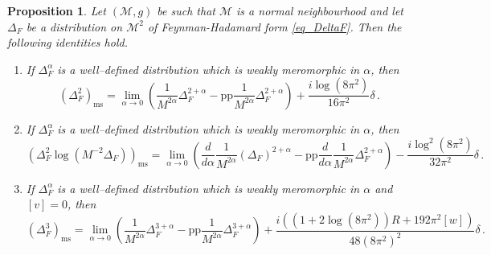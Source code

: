 \documentclass[a4paper,10pt,twoside]{article}
\numberwithin{equation}{section}
\newcounter{and}
\def\M{\mathcal{M}}
\def\pp{\mathrm{pp}}
\def\ms{\mathrm{ms}}
\theoremstyle{plain}
\newtheorem{propo}[theo]{Proposition}
\theoremstyle{definition}
\begin{document}
\begin{propo}\label{prop_equivalentscheme}Let $(\M,g)$ be such that $\M$ is a normal neighbourhood and let $\Delta_F$ be a distribution on $\M^2$ of Feynman-Hadamard form \eqref{eq_DeltaF}. Then the following identities hold.
\begin{enumerate}
\item If $\Delta_F^{\alpha}$ is a well--defined distribution which is weakly meromorphic in $\alpha$, then
%
$$(\Delta^2_F)_\ms=\lim_{\alpha\to 0}\left(\frac{1}{M^{2\alpha}}\Delta_F^{2+\alpha}-\pp\frac{1}{M^{2\alpha}}\Delta_F^{2+\alpha}\right)+\frac{i\log(8\pi^2)}{16\pi^2}\delta\,.$$
%
\item If $\Delta_F^{\alpha}$ is a well--defined distribution which is weakly meromorphic in $\alpha$, then
%
$$(\Delta^2_F\log \left(M^{-2}\Delta_F\right))_\ms=\lim_{\alpha\to 0}\left(\frac{d}{d\alpha}\frac{1}{M^{2\alpha}}(\Delta_F)^{2+\alpha}-\pp\frac{d}{d\alpha}\frac{1}{M^{2\alpha}}\Delta_F^{2+\alpha}\right)-\frac{i\log^2(8\pi^2)}{32\pi^2}\delta\,.$$
%
\item If $\Delta_F^{\alpha}$ is a well--defined distribution which is weakly meromorphic in $\alpha$ and $[v]=0$, then 
%
$$(\Delta^3_F)_\ms=\lim_{\alpha\to 0}\left(\frac{1}{M^{2\alpha}}\Delta_F^{3+\alpha}-\pp\frac{1}{M^{2\alpha}}\Delta_F^{3+\alpha}\right)+\frac{i\left((1+2\log(8\pi^2))R+192\pi^2[w]\right)}{48(8\pi^2)^2}\delta\,.$$
%
\end{enumerate}
\end{propo}
\end{document}
